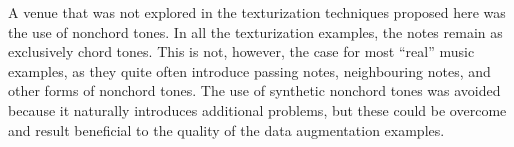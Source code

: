 
A venue that was not explored in the texturization
techniques proposed here was the use of nonchord tones. In
all the texturization examples, the notes remain as
exclusively chord tones. This is not, however, the case for
most ``real'' music examples, as they quite often introduce
passing notes, neighbouring notes, and other forms of
nonchord tones. The use of synthetic nonchord tones was
avoided because it naturally introduces additional problems,
but these could be overcome and result beneficial to the
quality of the data augmentation examples.
